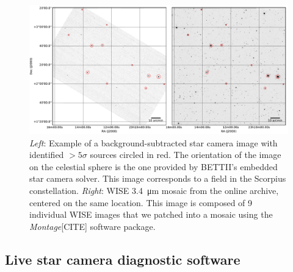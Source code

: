 \begin{landscape}
\begin{figure}[!ht]
	\centering
	\includegraphics[width=1.5\textwidth]{Figures/starcam_images.pdf}
	\caption[Star camera example WISE]{\textit{Left}: Example of a background-subtracted star camera image with identified $>5\sigma$ sources circled in red. The orientation of the image on the celestial sphere is the one provided by BETTII's embedded star camera solver. This image corresponds to a field in the Scorpius constellation. \textit{Right}: WISE \SI{3.4}{\um} mosaic from the online archive, centered on the same location. This image is composed of 9 individual WISE images that we patched into a mosaic using the \textit{Montage}[CITE] software package.}
	\label{fig:starcamexample}
    \end{figure}
\end{landscape}

\subsection{Live star camera diagnostic software}

